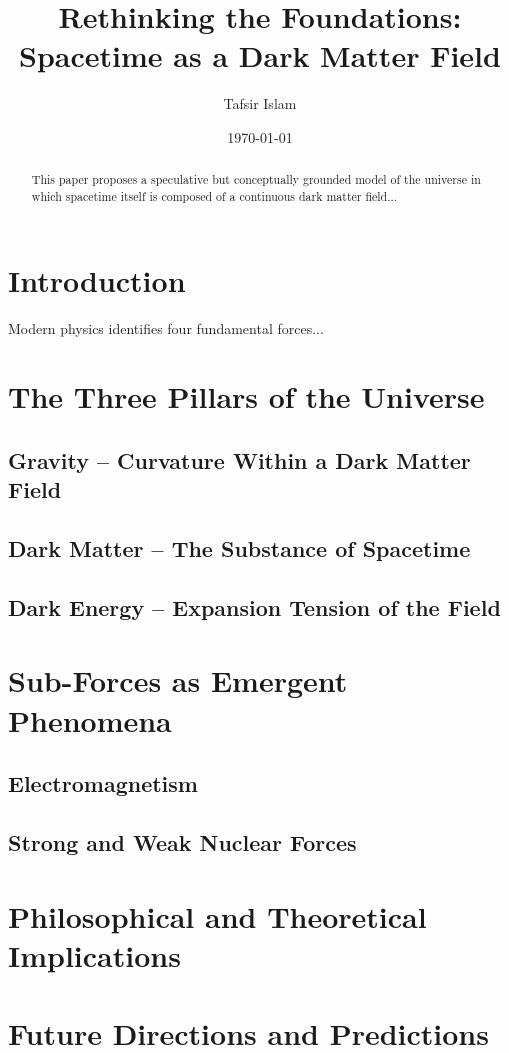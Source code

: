\documentclass[12pt]{article}
\title{Rethinking the Foundations: Spacetime as a Dark Matter Field}
\author{Tafsir Islam}
\date{\today}
\begin{document}
\maketitle

\begin{abstract}
This paper proposes a speculative but conceptually grounded model of the universe in which spacetime itself is composed of a continuous dark matter field...
\end{abstract}

\section{Introduction}
Modern physics identifies four fundamental forces...

\section{The Three Pillars of the Universe}
\subsection{Gravity – Curvature Within a Dark Matter Field}
\subsection{Dark Matter – The Substance of Spacetime}
\subsection{Dark Energy – Expansion Tension of the Field}

\section{Sub-Forces as Emergent Phenomena}
\subsection{Electromagnetism}
\subsection{Strong and Weak Nuclear Forces}

\section{Philosophical and Theoretical Implications}

\section{Future Directions and Predictions}
\end{document}
